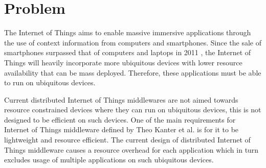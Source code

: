 \section{Problem}
\label{problem}
The Internet of Things aims to enable massive immersive applications through the use of context information from computers and smartphones. Since the sale of smartphones surpassed that of computers and laptops in 2011 \cite{canalsys}, the Internet of Things will heavily incorporate more ubiquitous devices with lower resource availability that can be mass deployed. Therefore, these applications must be able to run on ubiquitous devices.

Current distributed Internet of Things middlewares are not aimed towards resource constrained devices where they can run on ubiquitous devices, this is not designed to be efficient on such devices. One of the main requirements for Internet of Things middleware defined by Theo Kanter et al. \cite{Kanter539187} is for it to be lightweight and resource efficient. The current design of distributed Internet of Things middleware causes a resource overhead for each application which in turn excludes usage of multiple applications on such ubiquitous devices. 


